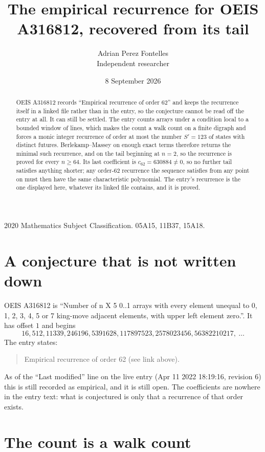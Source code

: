 \documentclass[11pt,a4paper]{article}
\title{The empirical recurrence for OEIS A316812, recovered from its tail}
\author{Adrian Perez Fontelles\\ \small Independent researcher}
\date{8 September 2026}
\theoremstyle{plain}
\theoremstyle{definition}
\begin{document}
\maketitle

\begin{abstract}
OEIS A316812 records ``Empirical recurrence of order $62$'' and keeps the recurrence itself in
a linked file rather than in the entry, so the conjecture cannot be read off the entry at all.
It can still be settled. The entry counts arrays under a condition local to a bounded window of
lines, which makes the count a walk count on a finite digraph and forces a monic integer
recurrence of order at most the number $S'=123$ of states with distinct futures. Berlekamp--Massey on
enough exact terms therefore returns the minimal such recurrence, and on the tail beginning at $n=2$, so the recurrence is proved for every $n\ge64$.
Its last coefficient is $c_{62}=630884\neq0$, so no further tail satisfies anything
shorter; any order-$62$ recurrence the sequence satisfies from any point on must then have
the same characteristic polynomial. The entry's recurrence is the one displayed here, whatever
its linked file contains, and it is proved.
\end{abstract}

\noindent\small 2020 Mathematics Subject Classification. 05A15, 11B37, 15A18.\normalsize

\section{A conjecture that is not written down}

OEIS A316812 is ``Number of n X 5 0..1 arrays with every element unequal to 0, 1, 2, 3, 4, 5 or 7 king-move adjacent elements, with upper left element zero.''. It has offset $1$ and begins
\[
16, 512, 11339, 246196, 5391628, 117897523, 2578023456, 56382210217,\ \dots
\]
The entry states:
\begin{quote}
Empirical recurrence of order 62 (see link above).
\end{quote}
As of the ``Last modified'' line on the live entry (Apr 11 2022 18:19:16, revision 6)
this is still recorded as empirical, and it is still open. The coefficients are nowhere in the
entry text: what is conjectured is only that a recurrence of that order exists.

\section{The count is a walk count}
\end{document}
